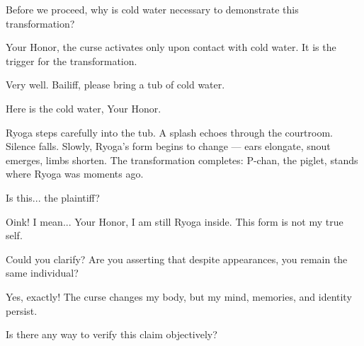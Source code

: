 \documentclass[12pt]{article}
\begin{document}
\begin{tcolorbox}[title=Judge:]
Before we proceed, why is cold water necessary to demonstrate this transformation?
\end{tcolorbox}

\begin{tcolorbox}[title=Plaintiff Counsel:]
Your Honor, the curse activates only upon contact with cold water. It is the trigger for the transformation.
\end{tcolorbox}

\begin{tcolorbox}[title=Judge:]
Very well. Bailiff, please bring a tub of cold water.
\end{tcolorbox}

\begin{tcolorbox}[title={Bailiff (entering with tub):}]
Here is the cold water, Your Honor.
\end{tcolorbox}

\begin{tcolorbox}[nobeforeafter,sharp corners=south, colframe=black!50!white, colback=white, fontupper=\itshape, center title, title=Stage Direction:]
Ryoga steps carefully into the tub. A splash echoes through the courtroom. Silence falls. Slowly, Ryoga’s form begins to change — ears elongate, snout emerges, limbs shorten. The transformation completes: P-chan, the piglet, stands where Ryoga was moments ago.
\end{tcolorbox}

\begin{tcolorbox}[title={Judge (leaning forward):}]
Is this... the plaintiff?
\end{tcolorbox}

\begin{tcolorbox}[title=P-chan:]
Oink! I mean... Your Honor, I am still Ryoga inside. This form is not my true self.
\end{tcolorbox}

\begin{tcolorbox}[title={Judge (confused):}]
Could you clarify? Are you asserting that despite appearances, you remain the same individual?
\end{tcolorbox}

\begin{tcolorbox}[title=P-chan:]
Yes, exactly! The curse changes my body, but my mind, memories, and identity persist.
\end{tcolorbox}

\begin{tcolorbox}[title=Judge:]
Is there any way to verify this claim objectively?
\end{tcolorbox}
\end{document}
